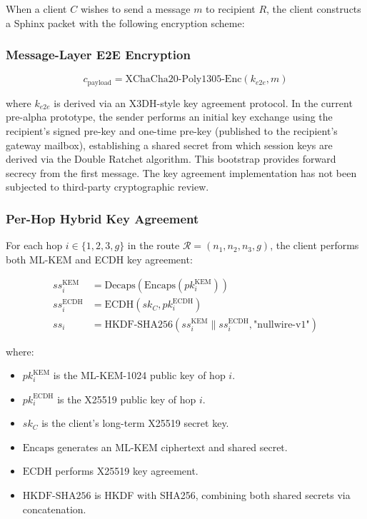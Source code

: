 \documentclass[11pt]{article}
\theoremstyle{definition}
\theoremstyle{remark}
\begin{document}
When a client $C$ wishes to send a message $m$ to recipient $R$, the client constructs a Sphinx packet with the following encryption scheme:

\subsubsection{Message-Layer E2E Encryption}

\begin{equation}
c_{\text{payload}} = \text{XChaCha20-Poly1305-Enc}(k_{e2e}, m)
\label{eq:msg-layer}
\end{equation}

where $k_{e2e}$ is derived via an X3DH-style key agreement protocol. In the current pre-alpha prototype, the sender performs an initial key exchange using the recipient's signed pre-key and one-time pre-key (published to the recipient's gateway mailbox), establishing a shared secret from which session keys are derived via the Double Ratchet algorithm. This bootstrap provides forward secrecy from the first message. The key agreement implementation has not been subjected to third-party cryptographic review.

\subsubsection{Per-Hop Hybrid Key Agreement}

For each hop $i \in \{1, 2, 3, g\}$ in the route $\mathcal{R} = (n_1, n_2, n_3, g)$, the client performs both ML-KEM and ECDH key agreement:

\begin{align}
ss_i^{\text{KEM}} &= \text{Decaps}(\text{Encaps}(pk_i^{\text{KEM}})) \label{eq:kem}\\
ss_i^{\text{ECDH}} &= \text{ECDH}(sk_C, pk_i^{\text{ECDH}}) \label{eq:ecdh}\\
ss_i &= \text{HKDF-SHA256}(ss_i^{\text{KEM}} \| ss_i^{\text{ECDH}}, \text{"nullwire-v1"}) \label{eq:hybrid}
\end{align}

where:
\begin{itemize}
    \item $pk_i^{\text{KEM}}$ is the ML-KEM-1024 public key of hop $i$.
    \item $pk_i^{\text{ECDH}}$ is the X25519 public key of hop $i$.
    \item $sk_C$ is the client's long-term X25519 secret key.
    \item $\text{Encaps}$ generates an ML-KEM ciphertext and shared secret.
    \item $\text{ECDH}$ performs X25519 key agreement.
    \item $\text{HKDF-SHA256}$ is HKDF with SHA256, combining both shared secrets via concatenation.
\end{itemize}
\end{document}
